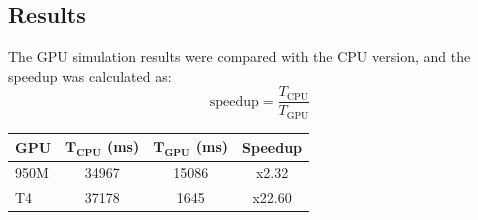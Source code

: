 \newpage
\subsection{Results}
The GPU simulation results were compared with the CPU version, and the speedup was calculated as:
\[
\text{speedup} = \frac{T_\text{CPU}}{T_\text{GPU}}
\]

\begin{table}[h!]
    \centering
    \begin{tabular}{lccc}
    \hline
    \textbf{GPU} & $\mathbf{T_{CPU}}$ (ms) & $\mathbf{T_{GPU}}$ (ms) & \textbf{Speedup} \\
    \hline
    950M & 34967 & 15086 & x2.32 \\
    T4   & 37178 & 1645  & x22.60 \\
    \hline
    \end{tabular}
\end{table}